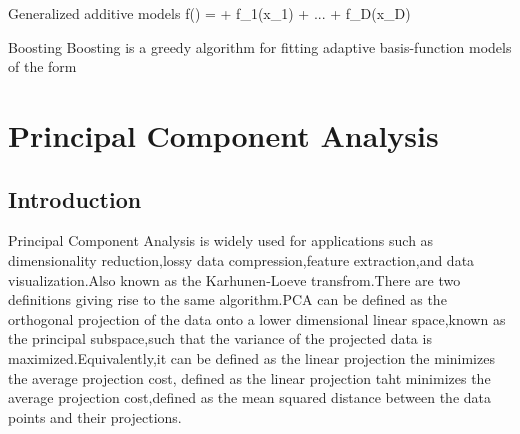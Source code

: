                                   Generalized additive models
                                  f() = \alpha + f_1(x_1) + ... + f_D(x_D)                                  


Boosting
  Boosting is a greedy algorithm for fitting adaptive basis-function models of the form 
  
  
  
  
  
  
 \chapter{Principal Component Analysis}
 \section{Introduction}
    Principal Component Analysis is widely used for applications such as dimensionality reduction,lossy data 
  compression,feature extraction,and data visualization.Also known as the Karhunen-Loeve transfrom.There are 
  two definitions giving rise to the same algorithm.PCA can be defined as the orthogonal projection of the data 
  onto a lower dimensional linear space,known as the principal subspace,such that the variance of the projected data
  is maximized.Equivalently,it can be defined as the linear projection the minimizes the average projection cost,
  defined as  the linear projection taht minimizes the average projection cost,defined as the mean squared distance
  between the data points and their projections.
